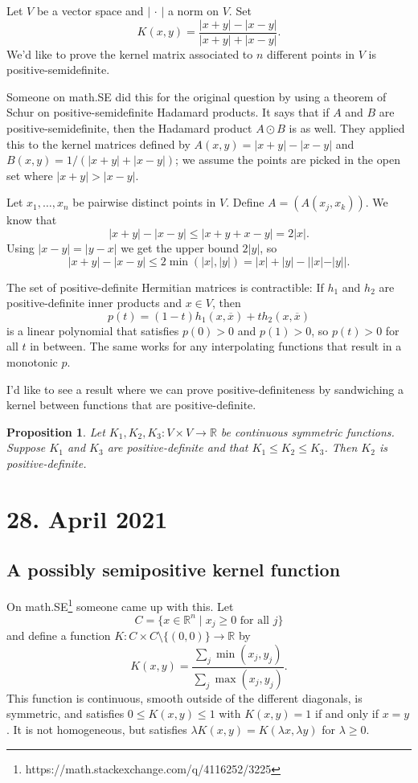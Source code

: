 \documentclass[11pt]{amsart}
\newtheorem{prop}[theo]{Proposition}
\theoremstyle{definition}
\newcommand{\kk}[1]{\mathbb{#1}}
\def\ov#1{\overline{#1}}
\begin{document}
Let $V$ be a vector space and $| \, \cdot \, |$ a norm on $V$. Set
\[
K(x,y) = \frac{|x+y|-|x-y|}{|x+y|+|x-y|}.
\]
We'd like to prove the kernel matrix associated to $n$ different points in $V$ is positive-semidefinite.

Someone on math.SE did this for the original question by using a theorem of Schur on positive-semidefinite Hadamard products. It says that if $A$ and $B$ are positive-semidefinite, then the Hadamard product $A \odot B$ is as well. They applied this to the kernel matrices defined by $A(x,y) = |x+y|-|x-y|$ and $B(x,y) = 1/(|x+y|+|x-y|)$; we assume the points are picked in the open set where $|x+y| > |x-y|$.

Let $x_1,\ldots,x_n$ be pairwise distinct points in $V$. Define
\(
A = (A(x_j,x_k))
\).
We know that
\[
|x+y|-|x-y| \leq |x + y + x - y| = 2 |x|.
\]
Using $|x-y|=|y-x|$ we get the upper bound $2|y|$, so
\[
|x+y|-|x-y| \leq 2 \min(|x|,|y|) = |x| + |y| - ||x| - |y||.
\]

The set of positive-definite Hermitian matrices is contractible: If $h_1$ and $h_2$ are positive-definite inner products and $x \in V$, then
\[
p(t) = (1-t) h_1(x, \ov x) + t h_2(x, \ov x)
\]
is a linear polynomial that satisfies $p(0) > 0$ and $p(1) > 0$, so $p(t) > 0$ for all $t$ in between. The same works for any interpolating functions that result in a monotonic $p$.



I'd like to see a result where we can prove positive-definiteness by sandwiching a
kernel between functions that are positive-definite.

\begin{prop}
Let $K_1, K_2, K_3 : V \times V \to \kk R$ be continuous symmetric functions. Suppose $K_1$ and $K_3$ are positive-definite and that $K_1 \leq K_2 \leq K_3$. Then $K_2$ is positive-definite.
\end{prop}


\section*{28. April 2021}
\subsection*{A possibly semipositive kernel function}

On math.SE\footnote{https://math.stackexchange.com/q/4116252/3225} someone came up with this. Let
\[
C = \{ x \in \kk R^n \mid x_j \geq 0 \text{ for all $j$}\}
\]
and define a function $K : C \times C \setminus \{(0,0)\} \to \kk R$ by
\[
K(x,y) = \frac{\sum_{j} \min(x_j, y_j)}{\sum_j \max(x_j, y_j)}.
\]
This function is continuous, smooth outside of the different diagonals, is symmetric, and satisfies $0 \leq K(x,y) \leq 1$ with $K(x,y) = 1$ if and only if $x = y$. It is not homogeneous, but satisfies $\lambda K(x,y) = K(\lambda x, \lambda y)$ for $\lambda \geq 0$.
\end{document}
